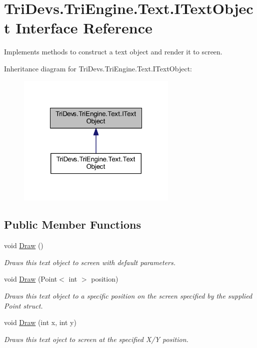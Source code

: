 \hypertarget{interface_tri_devs_1_1_tri_engine_1_1_text_1_1_i_text_object}{\section{Tri\-Devs.\-Tri\-Engine.\-Text.\-I\-Text\-Object Interface Reference}
\label{interface_tri_devs_1_1_tri_engine_1_1_text_1_1_i_text_object}
}


Implements methods to construct a text object and render it to screen.  




Inheritance diagram for Tri\-Devs.\-Tri\-Engine.\-Text.\-I\-Text\-Object\-:
\nopagebreak
\begin{figure}[H]
\begin{center}
\leavevmode
\includegraphics[width=216pt]{interface_tri_devs_1_1_tri_engine_1_1_text_1_1_i_text_object__inherit__graph}
\end{center}
\end{figure}
\subsection*{Public Member Functions}
\begin{DoxyCompactItemize}
\item 
void \hyperlink{interface_tri_devs_1_1_tri_engine_1_1_text_1_1_i_text_object_a97cdabe5df7c203503b91ebf7a6c42ad}{Draw} ()
\begin{DoxyCompactList}\small\item\em Draws this text object to screen with default parameters. \end{DoxyCompactList}\item 
void \hyperlink{interface_tri_devs_1_1_tri_engine_1_1_text_1_1_i_text_object_ad41a8d9fcf1fe46645aad68da230c18b}{Draw} (Point$<$ int $>$ position)
\begin{DoxyCompactList}\small\item\em Draws this text object to a specific position on the screen specified by the supplied Point struct. \end{DoxyCompactList}\item 
void \hyperlink{interface_tri_devs_1_1_tri_engine_1_1_text_1_1_i_text_object_adb6766f846e2c116c2fecdec3c6aaeac}{Draw} (int x, int y)
\begin{DoxyCompactList}\small\item\em Draws this text oject to screen at the specified X/\-Y position. \end{DoxyCompactList}\end{DoxyCompactItemize}
